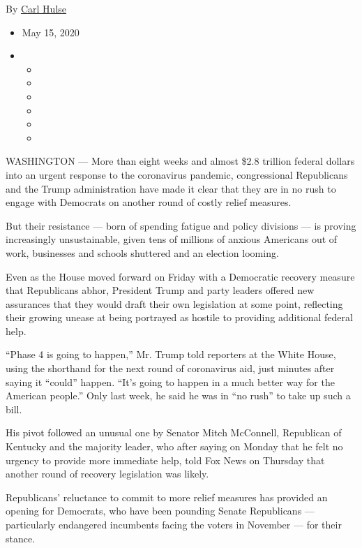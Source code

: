 By \href{https://www.nytimes.com/by/carl-hulse}{Carl Hulse}

\begin{itemize}
\item
  May 15, 2020
\item
  \begin{itemize}
  \item
  \item
  \item
  \item
  \item
  \item
  \end{itemize}
\end{itemize}

WASHINGTON --- More than eight weeks and almost \$2.8 trillion federal
dollars into an urgent response to the coronavirus pandemic,
congressional Republicans and the Trump administration have made it
clear that they are in no rush to engage with Democrats on another round
of costly relief measures.

But their resistance --- born of spending fatigue and policy divisions
--- is proving increasingly unsustainable, given tens of millions of
anxious Americans out of work, businesses and schools shuttered and an
election looming.

Even as the House moved forward on Friday with a Democratic recovery
measure that Republicans abhor, President Trump and party leaders
offered new assurances that they would draft their own legislation at
some point, reflecting their growing unease at being portrayed as
hostile to providing additional federal help.

``Phase 4 is going to happen,'' Mr. Trump told reporters at the White
House, using the shorthand for the next round of coronavirus aid, just
minutes after saying it ``could'' happen. ``It's going to happen in a
much better way for the American people.'' Only last week, he said he
was in ``no rush'' to take up such a bill.

His pivot followed an unusual one by Senator Mitch McConnell, Republican
of Kentucky and the majority leader, who after saying on Monday that he
felt no urgency to provide more immediate help, told Fox News on
Thursday that another round of recovery legislation was likely.

Republicans' reluctance to commit to more relief measures has provided
an opening for Democrats, who have been pounding Senate Republicans ---
particularly endangered incumbents facing the voters in November --- for
their stance.

